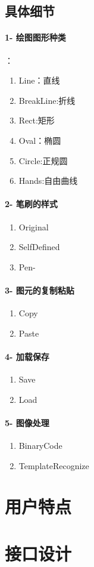 \documentclass[UTF8,a4paper,8pt]{ctexart}
\begin{document}
      \subsection{具体细节}
      
      \paragraph{1- 绘图图形种类}：
      
       	\begin{enumerate}
       	  \item Line：直线
       	  \item BreakLine:折线
       	  \item Rect:矩形
       	  \item Oval：椭圆
       	  \item Circle:正规圆
       	  \item Hands:自由曲线
       	 \end{enumerate}
       	      	
      \paragraph{2- 笔刷的样式}
      
      	\begin{enumerate}
           \item Original
           \item SelfDefined
           \item Pen-
      	\end{enumerate}
      	
      \paragraph{3- 图元的复制粘贴}
        	\begin{enumerate}
        		\item  Copy
        		\item  Paste
        	\end{enumerate}
      \paragraph{4- 加载保存}
        	\begin{enumerate}
        		\item  Save
        		\item  Load
        	\end{enumerate}
      \paragraph{5- 图像处理}
         	\begin{enumerate}
         		\item  BinaryCode
         		\item  TemplateRecognize
         	\end{enumerate}
      
   \section{用户特点}
   
   
   \section{接口设计}
\end{document}
